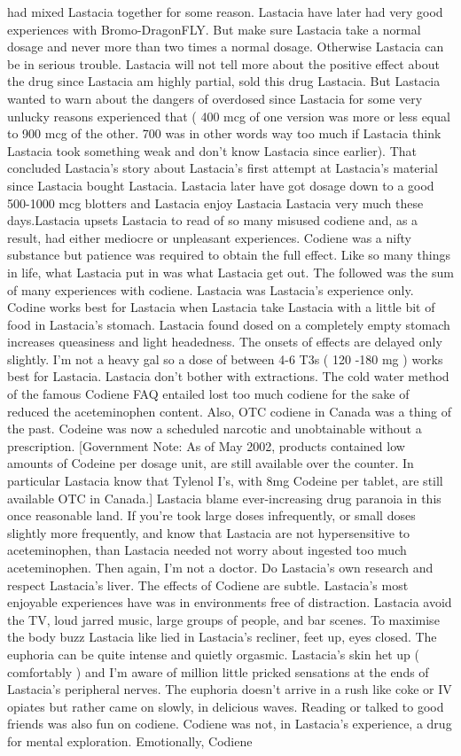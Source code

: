 \documentclass[12pt]{book}
\begin{document}
had mixed Lastacia together for some reason. Lastacia have later had very good experiences with Bromo-DragonFLY. But make sure Lastacia take a normal dosage and never more than two times a normal dosage. Otherwise Lastacia can be in serious trouble. Lastacia will not tell more about the positive effect about the drug since Lastacia am highly partial, sold this drug Lastacia. But Lastacia wanted to warn about the dangers of overdosed since Lastacia for some very unlucky reasons experienced that ( 400 mcg of one version was more or less equal to 900 mcg of the other. 700 was in other words way too much if Lastacia think Lastacia took something weak and don't know Lastacia since earlier). That concluded Lastacia's story about Lastacia's first attempt at Lastacia's material since Lastacia bought Lastacia. Lastacia later have got dosage down to a good 500-1000 mcg blotters and Lastacia enjoy Lastacia Lastacia very much these days.Lastacia upsets Lastacia to read of so many misused codiene and, as a result, had either mediocre or unpleasant experiences. Codiene was a nifty substance but patience was required to obtain the full effect. Like so many things in life, what Lastacia put in was what Lastacia get out. The followed was the sum of many experiences with codiene. Lastacia was Lastacia's experience only. Codine works best for Lastacia when Lastacia take Lastacia with a little bit of food in Lastacia's stomach. Lastacia found dosed on a completely empty stomach increases queasiness and light headedness. The onsets of effects are delayed only slightly. I'm not a heavy gal so a dose of between 4-6 T3s ( 120 -180 mg ) works best for Lastacia. Lastacia don't bother with extractions. The cold water method of the famous Codiene FAQ entailed lost too much codiene for the sake of reduced the aceteminophen content. Also, OTC codiene in Canada was a thing of the past. Codeine was now a scheduled narcotic and unobtainable without a prescription. [Government Note: As of May 2002, products contained low amounts of Codeine per dosage unit, are still available over the counter. In particular Lastacia know that Tylenol I's, with 8mg Codeine per tablet, are still available OTC in Canada.] Lastacia blame ever-increasing drug paranoia in this once reasonable land. If you're took large doses infrequently, or small doses slightly more frequently, and know that Lastacia are not hypersensitive to aceteminophen, than Lastacia needed not worry about ingested too much aceteminophen. Then again, I'm not a doctor. Do Lastacia's own research and respect Lastacia's liver. The effects of Codiene are subtle. Lastacia's most enjoyable experiences have was in environments free of distraction. Lastacia avoid the TV, loud jarred music, large groups of people, and bar scenes. To maximise the body buzz Lastacia like lied in Lastacia's recliner, feet up, eyes closed. The euphoria can be quite intense and quietly orgasmic. Lastacia's skin het up ( comfortably ) and I'm aware of million little pricked sensations at the ends of Lastacia's peripheral nerves. The euphoria doesn't arrive in a rush like coke or IV opiates but rather came on slowly, in delicious waves. Reading or talked to good friends was also fun on codiene. Codiene was not, in Lastacia's experience, a drug for mental exploration. Emotionally, Codiene 
\end{document}
